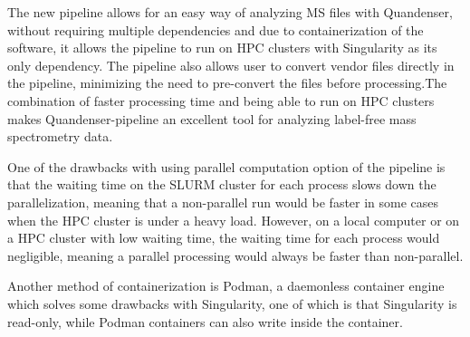 \documentclass[11pt]{article}
\begin{document}
The new pipeline allows for an easy way of analyzing MS files with Quandenser, without requiring multiple dependencies and due to containerization of the software, it allows the pipeline to run on HPC clusters with Singularity as its only dependency. The pipeline also allows user to convert vendor files directly in the pipeline, minimizing the need to pre-convert the files before processing.The combination of faster processing time and being able to run on HPC clusters makes Quandenser-pipeline an excellent tool for analyzing label-free mass spectrometry data.

One of the drawbacks with using parallel computation option of the pipeline is that the waiting time on the SLURM cluster for each process slows down the parallelization, meaning that a non-parallel run would be faster in some cases when the HPC cluster is under a heavy load. However, on a local computer or on a HPC cluster with low waiting time, the waiting time for each process would negligible, meaning a parallel processing would always be faster than non-parallel.

Another method of containerization is Podman, a daemonless container engine which solves some drawbacks with Singularity, one of which is that Singularity is read-only, while Podman containers can also write inside the container.




\end{document}
